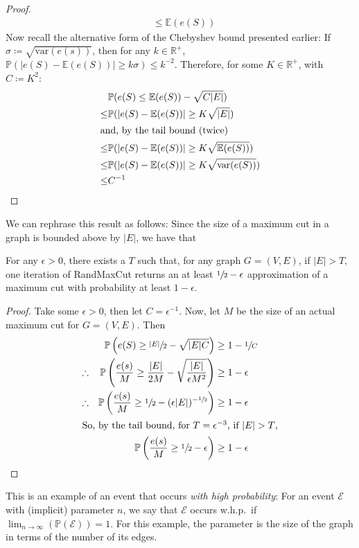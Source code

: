 \begin{proof}
\begin{align*}
					                        &\leq \mathbb{E}(e(S))
			\end{align*}
			Now recall the alternative form of the Chebyshev bound presented earlier: If $\sigma \coloneqq 
			\sqrt{\mathrm{var}(e(s))}$, then for any $k \in \mathbb{R}^+$, $\mathbb{P}(|e(S) - \mathbb{E}(e(S))| \geq 
			k\sigma) \leq k^{-2}$. Therefore, for some $K \in \mathbb{R}^+$, with $C \coloneqq K^2$:
			\begin{align*}
				& \mathbb{P}(e(S) \leq \mathbb{E}(e(S)) - \sqrt{C |E|}) \\
				\leq& \mathbb{P}(|e(S) - \mathbb{E}(e(S))| \geq K\sqrt{|E|}) \\
				\intertext{and, by the tail bound (twice)}
				\leq& \mathbb{P}(|e(S) - \mathbb{E}(e(S))| \geq K\sqrt{\mathbb{E}(e(S))}) \\ 
				\leq& \mathbb{P}(|e(S) - \mathbb{E}(e(S))| \geq K\sqrt{\mathrm{var}(e(S))}) \\
				\leq&C^{-1}
			\end{align*}
		\end{proof}
		
		We can rephrase this result as follows: Since the size of a maximum cut in a graph is bounded above by $|E|$, we have
		that
		\begin{lemma}
			For any $\epsilon > 0$, there exists a $T$ such that, for any graph $G=(V, E)$, if $|E| > T$, one iteration 
			of RandMaxCut returns an at least $\sfrac{1}{2} - \epsilon$ approximation of a maximum cut with probability at 
			least $1 - \epsilon$.
		\end{lemma}
		\begin{proof}
			Take some $\epsilon > 0$, then let $C = \epsilon^{-1}$. Now, let $M$ be the size of an actual maximum cut for
			$G = (V,E)$. Then
			\begin{align*}
				           && \mathbb{P}\left(e(S) \geq \sfrac{|E|}{2}-\sqrt{|E|C}\right)& \geq 1 - \sfrac{1}{C} \\
				\therefore && \mathbb{P}\left(\frac{e(s)}{M} \geq \frac{|E|}{2M}-\sqrt{\frac{|E|}{\epsilon M^2}}\right) 
				           & \geq 1-\epsilon \\
				\therefore && \mathbb{P}\left(\frac{e(s)}{M} \geq \sfrac{1}{2} - (\epsilon |E|)^{-\sfrac{1}{2}}\right) 
				           & \geq 1-\epsilon \\
				\intertext{So, by the tail bound, for $T = \epsilon^{-3}$, if $|E| > T$,}
				           && \mathbb{P}\left(\frac{e(s)}{M} \geq \sfrac{1}{2} - \epsilon\right) 
				           & \geq 1-\epsilon
			\end{align*}
		\end{proof}
		This is an example of an event that occurs \emph{with high probability}: For an event $\mathcal{E}$ with (implicit) 
		parameter $n$, we say that $\mathcal{E}$ occurs w.h.p.\ if $\lim_{n \rightarrow \infty}(\mathbb{P}(\mathcal{E})) = 1$.
		For this example, the parameter is the size of the graph in terms of the number of its edges.

